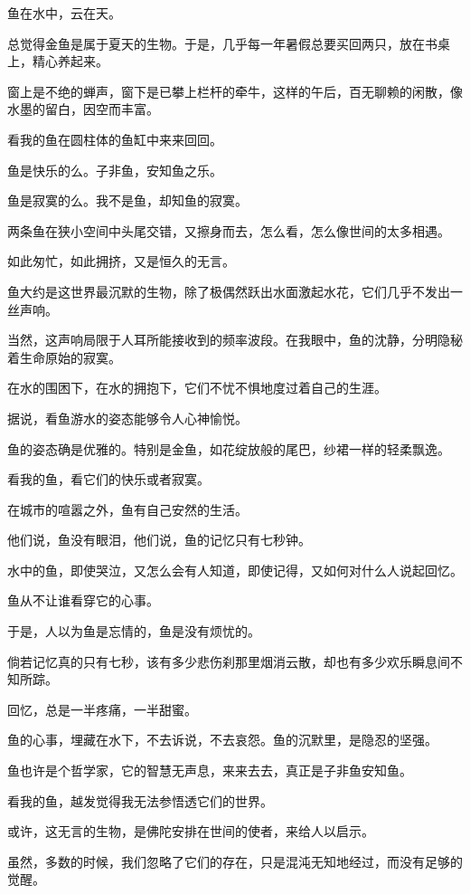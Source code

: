 \documentclass[12pt,a4paper]{article}
\def\blankrev{\vspace{1ex}}									%
\begin{document}
	\endwriting



		鱼在水中，云在天。

		\blankrev \blankrev
		总觉得金鱼是属于夏天的生物。于是，几乎每一年暑假总要买回两只，放在书桌上，精心养起来。\par
		窗上是不绝的蝉声，窗下是已攀上栏杆的牵牛，这样的午后，百无聊赖的闲散，像水墨的留白，因空而丰富。

		\blankrev
		看我的鱼在圆柱体的鱼缸中来来回回。

		\blankrev
		鱼是快乐的么。子非鱼，安知鱼之乐。\par
		鱼是寂寞的么。我不是鱼，却知鱼的寂寞。\par
		两条鱼在狭小空间中头尾交错，又擦身而去，怎么看，怎么像世间的太多相遇。\par
		如此匆忙，如此拥挤，又是恒久的无言。

		\blankrev
		鱼大约是这世界最沉默的生物，除了极偶然跃出水面激起水花，它们几乎不发出一丝声响。\par
		当然，这声响局限于人耳所能接收到的频率波段。在我眼中，鱼的沈静，分明隐秘着生命原始的寂寞。\par
		在水的围困下，在水的拥抱下，它们不忧不惧地度过着自己的生涯。

		\blankrev
		据说，看鱼游水的姿态能够令人心神愉悦。\par
		鱼的姿态确是优雅的。特别是金鱼，如花绽放般的尾巴，纱裙一样的轻柔飘逸。\par
		看我的鱼，看它们的快乐或者寂寞。\par
		在城市的喧嚣之外，鱼有自己安然的生活。

		\blankrev
		他们说，鱼没有眼泪，他们说，鱼的记忆只有七秒钟。\par
		水中的鱼，即使哭泣，又怎么会有人知道，即使记得，又如何对什么人说起回忆。

		\blankrev
		鱼从不让谁看穿它的心事。\par
		于是，人以为鱼是忘情的，鱼是没有烦忧的。\par
		倘若记忆真的只有七秒，该有多少悲伤刹那里烟消云散，却也有多少欢乐瞬息间不知所踪。

		\blankrev
		回忆，总是一半疼痛，一半甜蜜。

		\blankrev
		鱼的心事，埋藏在水下，不去诉说，不去哀怨。鱼的沉默里，是隐忍的坚强。\par
		鱼也许是个哲学家，它的智慧无声息，来来去去，真正是子非鱼安知鱼。\par
		看我的鱼，越发觉得我无法参悟透它们的世界。\par
		或许，这无言的生物，是佛陀安排在世间的使者，来给人以启示。\par
		虽然，多数的时候，我们忽略了它们的存在，只是混沌无知地经过，而没有足够的觉醒。
\end{document}
